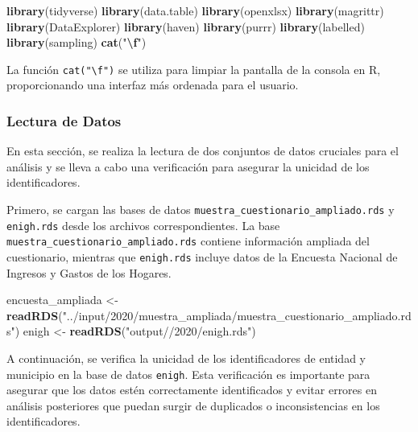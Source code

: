 \documentclass[
  12pt,
]{book}
\newenvironment{Shaded}{\begin{snugshade}}{\end{snugshade}}
\newcommand{\FunctionTok}[1]{\textcolor[rgb]{0.13,0.29,0.53}{\textbf{#1}}}
\newcommand{\NormalTok}[1]{#1}
\newcommand{\OtherTok}[1]{\textcolor[rgb]{0.56,0.35,0.01}{#1}}
\newcommand{\SpecialCharTok}[1]{\textcolor[rgb]{0.81,0.36,0.00}{\textbf{#1}}}
\newcommand{\StringTok}[1]{\textcolor[rgb]{0.31,0.60,0.02}{#1}}
\begin{document}
\begin{Shaded}
\begin{Highlighting}[]
\FunctionTok{library}\NormalTok{(tidyverse)}
\FunctionTok{library}\NormalTok{(data.table)}
\FunctionTok{library}\NormalTok{(openxlsx)}
\FunctionTok{library}\NormalTok{(magrittr)}
\FunctionTok{library}\NormalTok{(DataExplorer)}
\FunctionTok{library}\NormalTok{(haven)}
\FunctionTok{library}\NormalTok{(purrr)}
\FunctionTok{library}\NormalTok{(labelled)}
\FunctionTok{library}\NormalTok{(sampling)}
\FunctionTok{cat}\NormalTok{(}\StringTok{"}\SpecialCharTok{\textbackslash{}f}\StringTok{"}\NormalTok{)}
\end{Highlighting}
\end{Shaded}

La función \texttt{cat("\textbackslash{}f")} se utiliza para limpiar la pantalla de la consola en R, proporcionando una interfaz más ordenada para el usuario.

\hypertarget{lectura-de-datos}{%
\subsubsection*{Lectura de Datos}\label{lectura-de-datos}}

En esta sección, se realiza la lectura de dos conjuntos de datos cruciales para el análisis y se lleva a cabo una verificación para asegurar la unicidad de los identificadores.

Primero, se cargan las bases de datos \texttt{muestra\_cuestionario\_ampliado.rds} y \texttt{enigh.rds} desde los archivos correspondientes. La base \texttt{muestra\_cuestionario\_ampliado.rds} contiene información ampliada del cuestionario, mientras que \texttt{enigh.rds} incluye datos de la Encuesta Nacional de Ingresos y Gastos de los Hogares.

\begin{Shaded}
\begin{Highlighting}[]
\NormalTok{encuesta\_ampliada }\OtherTok{\textless{}{-}} \FunctionTok{readRDS}\NormalTok{(}\StringTok{"../input/2020/muestra\_ampliada/muestra\_cuestionario\_ampliado.rds"}\NormalTok{)}
\NormalTok{enigh }\OtherTok{\textless{}{-}} \FunctionTok{readRDS}\NormalTok{(}\StringTok{"output//2020/enigh.rds"}\NormalTok{)}
\end{Highlighting}
\end{Shaded}

A continuación, se verifica la unicidad de los identificadores de entidad y municipio en la base de datos \texttt{enigh}. Esta verificación es importante para asegurar que los datos estén correctamente identificados y evitar errores en análisis posteriores que puedan surgir de duplicados o inconsistencias en los identificadores.
\end{document}

